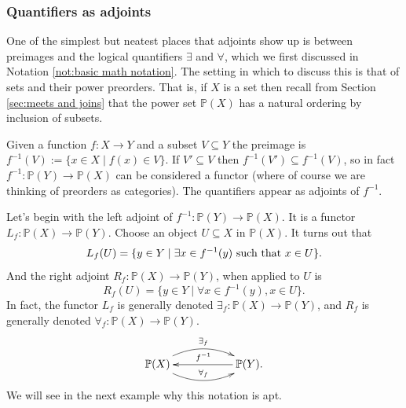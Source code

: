 \documentclass{book}
\def\tn{\textnormal}
\def\PP{{\mathbb P}}
\def\to{\rightarrow}
\def\taking{\colon}
\def\ss{\subseteq}
\def\|{{\;|\;}}
\def\m1{{-1}}
\theoremstyle{remark}
\theoremstyle{definition}
\begin{document}

\subsubsection{Quantifiers as adjoints}

One of the simplest but neatest places that adjoints show up is between preimages and the logical quantifiers $\exists$ and $\forall$, which we first discussed in Notation \ref{not:basic math notation}.  The setting in which to discuss this is that of sets and their power preorders. That is, if $X$ is a set then recall from Section \ref{sec:meets and joins} that the power set $\PP(X)$ has a natural ordering by inclusion of subsets. 

Given a function $f\taking X\to Y$ and a subset $V\ss Y$ the preimage is $f^\m1(V):=\{x\in X\|f(x)\in V\}$. If $V'\ss V$ then $f^\m1(V')\ss f^\m1(V)$, so in fact $f^\m1\taking\PP(Y)\to\PP(X)$ can be considered a functor (where of course we are thinking of preorders as categories). The quantifiers appear as adjoints of $f^\m1$.

Let's begin with the left adjoint of $f^\m1\taking\PP(Y)\to\PP(X)$. It is a functor $L_f\taking\PP(X)\to\PP(Y)$. Choose an object $U\ss X$ in $\PP(X)$. It turns out that
$$L_f(U)=\{y\in Y\|\exists x\in f^\m1(y)\tn{ such that }x\in U\}.$$
And the right adjoint $R_f\taking\PP(X)\to\PP(Y)$, when applied to $U$ is 
$$R_f(U)=\{y\in Y\|\forall x\in f^\m1(y), x\in U\}.$$
In fact, the functor $L_f$ is generally denoted $\exists_f\taking\PP(X)\to\PP(Y)$, and $R_f$ is generally denoted $\forall_f\taking\PP(X)\to\PP(Y)$. 
$$
\xymatrix{\PP(X)\ar@/^1.2pc/[rr]^{\exists_f}\ar@/_1.2pc/[rr]^{\forall_f}&&\PP(Y)\ar[ll]_{f^\m1}.}
$$
We will see in the next example why this notation is apt.
\end{document}
